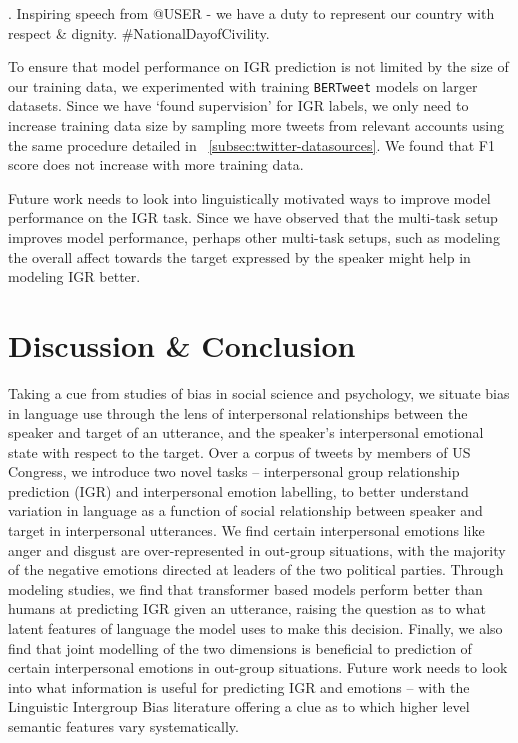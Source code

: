 \ex. \label{ex:admiration} Inspiring speech from @USER - we have a duty to represent our country with respect \& dignity. \#NationalDayofCivility.

To ensure that model performance on IGR prediction is not limited by the size of our training data, we experimented with training \texttt{BERTweet} models on larger datasets. Since we have `found supervision' for IGR labels, we only need to increase training data size by sampling more tweets from relevant accounts using the same procedure detailed in \textsection~\ref{subsec:twitter-datasources}. We found that F1 score does not increase with more training data.

Future work needs to look into linguistically motivated ways to improve model performance on the IGR task. Since we have observed that the multi-task setup improves model performance, perhaps other multi-task setups, such as modeling the overall affect towards the target expressed by the speaker might help in modeling IGR better.



\section{Discussion \& Conclusion}

Taking a cue from studies of bias in social science and psychology, we situate bias in language use through the lens of interpersonal relationships between the speaker and target of an utterance, and the speaker's interpersonal emotional state with respect to the target. Over a corpus of tweets by members of US Congress,  we introduce two novel tasks -- interpersonal group relationship prediction (IGR) and interpersonal emotion labelling, to better understand variation in language as a function of social relationship between speaker and target in interpersonal utterances. We find certain interpersonal emotions like anger and disgust are over-represented in out-group situations, with the majority of the negative emotions directed at leaders of the two political parties. Through modeling studies, we find that transformer based models perform better than humans at predicting IGR given an utterance, raising the question as to what latent features of language the model uses to make this decision. Finally, we also find that joint modelling of the two dimensions is beneficial to prediction of certain interpersonal emotions in out-group situations. Future work needs to look into what information is useful for predicting IGR and emotions -- with the Linguistic Intergroup Bias literature offering a clue as to which higher level semantic features vary systematically.

